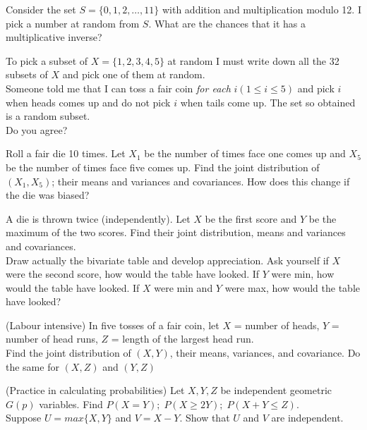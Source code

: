 \documentclass[12pt]{article}
\newenvironment{question}[2][Question]{\begin{trivlist}
\item[\hskip \labelsep {\bfseries #1}\hskip \labelsep {\bfseries #2.}]}{\end{trivlist}}
\begin{document}
\begin{question}{35}
Consider the set $S = \{0,1,2,\ldots,11\}$ with addition and multiplication modulo 12. I pick a number at random from $S$. What are the chances that it has a multiplicative inverse?
\end{question}

\begin{question}{36}
To pick a subset of $X=\{1,2,3,4,5\}$ at random I must write down all the 32 subsets of $X$ and pick one of them at random.\\
Someone told me that I can toss a fair coin \textit{for each} $i (1 \leq i \leq 5)$ and pick $i$ when heads comes up and do not pick $i$ when tails come up. The set so obtained is a random subset.\\ Do you agree?
\end{question}

\begin{question}{37}
Roll a fair die 10 times. Let $X_1$ be the number of times face one comes up and $X_5$ be the number of times face five comes up. Find the joint distribution of $(X_1,X_5)$; their means and variances and covariances. How does this change if the die was biased?
\end{question}

\begin{question}{38}
A die is thrown twice (independently). Let $X$ be the first score and $Y$ be the maximum of the two scores. Find their joint distribution, means and variances and covariances.\\
Draw actually the bivariate table and develop appreciation. Ask yourself if $X$ were the second score, how would the table have looked. If $Y$ were min, how would the table have looked. If $X$ were min and $Y$ were max, how would the table have looked?
\end{question}

\begin{question}{39}
(Labour intensive) In five tosses of a fair coin, let $X$ = number of heads, $Y$ = number of head runs, $Z$ = length of the largest head run.\\
Find the joint distribution of $(X,Y)$, their means, variances, and covariance. Do the same for $(X,Z)$ and $(Y,Z)$
\end{question}

\begin{question}{40}
(Practice in calculating probabilities) Let $X,Y,Z$ be independent geometric $G(p)$ variables. Find $P(X=Y);\;P(X \geq 2Y);\;P(X+Y \leq Z)$. \\ Suppose $U = max\{X,Y\}$ and $V=X-Y$. Show that $U$ and $V$ are independent.
\end{question}
\end{document}
